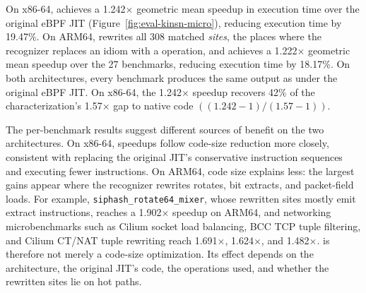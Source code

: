 On x86-64, \lang achieves a 1.242$\times$ geometric mean speedup in execution time over the original eBPF JIT (Figure~\ref{fig:eval-kinsn-micro}), reducing execution time by 19.47\%.
On ARM64, \lang rewrites all 308 matched \emph{sites}, the places where the recognizer replaces an idiom with a \lang operation, and achieves a 1.222$\times$ geometric mean speedup over the 27 benchmarks, reducing execution time by 18.17\%.
On both architectures, every benchmark produces the same output as under the original eBPF JIT.
On x86-64, the 1.242$\times$ speedup recovers 42\% of the characterization's 1.57$\times$ gap to native code $((1.242{-}1)/(1.57{-}1))$.



The per-benchmark results suggest different sources of benefit on the two architectures.
On x86-64, speedups follow code-size reduction more closely, consistent with \lang replacing the original JIT's conservative instruction sequences and executing fewer instructions.
On ARM64, code size explains less: the largest gains appear where the recognizer rewrites rotates, bit extracts, and packet-field loads.
For example, \texttt{siphash\_rotate64\_\allowbreak mixer}, whose rewritten sites mostly emit extract instructions, reaches a 1.902$\times$ speedup on ARM64, and networking microbenchmarks such as Cilium socket load balancing, BCC TCP tuple filtering, and Cilium CT/NAT tuple rewriting reach 1.691$\times$, 1.624$\times$, and 1.482$\times$.
\lang is therefore not merely a code-size optimization. Its effect depends on the architecture, the original JIT's code, the \lang operations used, and whether the rewritten sites lie on hot paths.

